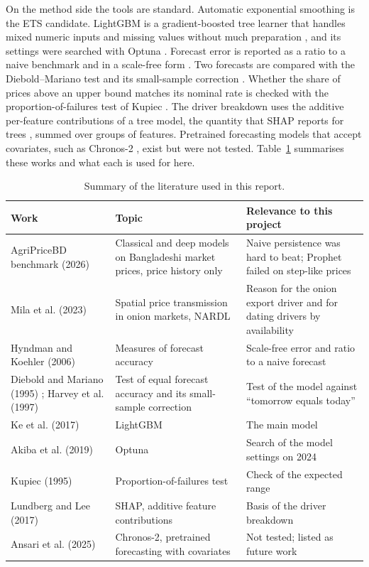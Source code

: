 \documentclass[12pt]{report}
\begin{document}
On the method side the tools are standard. Automatic exponential smoothing is the ETS candidate. LightGBM is a gradient-boosted tree learner that handles mixed numeric inputs and missing values without much preparation \cite{lightgbm}, and its settings were searched with Optuna \cite{optuna}. Forecast error is reported as a ratio to a naive benchmark and in a scale-free form \cite{hk2006}. Two forecasts are compared with the Diebold--Mariano test \cite{dm1995} and its small-sample correction \cite{hln1997}. Whether the share of prices above an upper bound matches its nominal rate is checked with the proportion-of-failures test of Kupiec \cite{kupiec}. The driver breakdown uses the additive per-feature contributions of a tree model, the quantity that SHAP reports for trees \cite{shap}, summed over groups of features. Pretrained forecasting models that accept covariates, such as Chronos-2 \cite{chronos2}, exist but were not tested. Table~\ref{tab:lit} summarises these works and what each is used for here.

\begin{table}[H]\centering\small
\caption{Summary of the literature used in this report.}\label{tab:lit}
\begin{tabular}{|p{2.6cm}|p{3.6cm}|p{5.2cm}|}
\hline
\textbf{Work} & \textbf{Topic} & \textbf{Relevance to this project} \\
\hline
AgriPriceBD benchmark (2026) \cite{agripricebd} & Classical and deep models on Bangladeshi market prices, price history only & Naive persistence was hard to beat; Prophet failed on step-like prices \\
\hline
Mila et al. (2023) \cite{onionnardl} & Spatial price transmission in onion markets, NARDL & Reason for the onion export driver and for dating drivers by availability \\
\hline
Hyndman and Koehler (2006) \cite{hk2006} & Measures of forecast accuracy & Scale-free error and ratio to a naive forecast \\
\hline
Diebold and Mariano (1995) \cite{dm1995}; Harvey et al. (1997) \cite{hln1997} & Test of equal forecast accuracy and its small-sample correction & Test of the model against ``tomorrow equals today'' \\
\hline
Ke et al. (2017) \cite{lightgbm} & LightGBM & The main model \\
\hline
Akiba et al. (2019) \cite{optuna} & Optuna & Search of the model settings on 2024 \\
\hline
Kupiec (1995) \cite{kupiec} & Proportion-of-failures test & Check of the expected range \\
\hline
Lundberg and Lee (2017) \cite{shap} & SHAP, additive feature contributions & Basis of the driver breakdown \\
\hline
Ansari et al. (2025) \cite{chronos2} & Chronos-2, pretrained forecasting with covariates & Not tested; listed as future work \\
\hline
\end{tabular}
\end{table}
\end{document}

